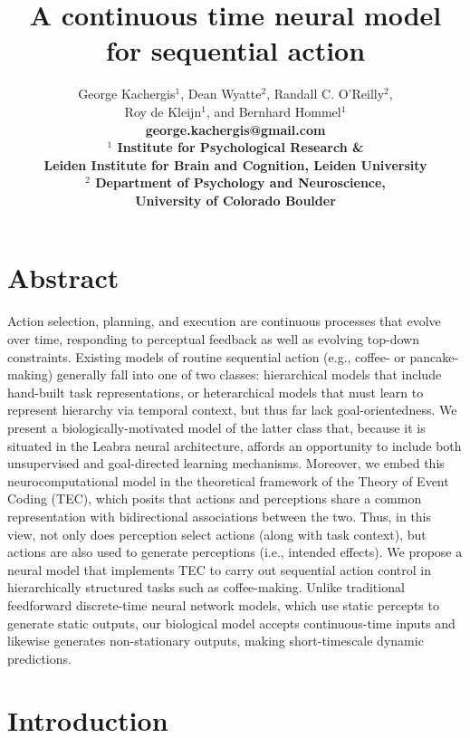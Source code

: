 \documentclass[10pt,letterpaper]{article}
\title{A continuous time neural model for sequential action}
\author{George Kachergis$^1$, Dean Wyatte$^2$, Randall C. O'Reilly$^2$, \\
	Roy de Kleijn$^1$, and Bernhard Hommel$^1$ \\
	\bf george.kachergis@gmail.com \\
	$^1$ Institute for Psychological Research \& \\
	Leiden Institute for Brain and Cognition, Leiden University \\
	$^2$ Department of Psychology and Neuroscience, \\
	University of Colorado Boulder }
\date{}
\numberwithin{equation}{section}
\begin{document}
\maketitle



\sloppy

\section*{Abstract}

Action selection, planning, and execution are continuous processes that evolve over time, responding to perceptual feedback as well as evolving top-down constraints. Existing models of routine sequential action (e.g., coffee- or pancake-making) generally fall into one of two classes: hierarchical models that include hand-built task representations, or heterarchical models that must learn to represent hierarchy via temporal context, but thus far lack goal-orientedness. We present a biologically-motivated model of the latter class that, because it is situated in the Leabra neural architecture, affords an opportunity to include both unsupervised and goal-directed learning mechanisms.  Moreover, we embed this neurocomputational model in the theoretical framework of the Theory of Event Coding (TEC), which posits that actions and perceptions share a common representation with bidirectional associations between the two. Thus, in this view, not only does perception select actions (along with task context), but actions are also used to generate perceptions (i.e., intended effects). We propose a neural model that implements TEC to carry out sequential action control in hierarchically structured tasks such as coffee-making. Unlike traditional feedforward discrete-time neural network models, which use static percepts to generate static outputs, our biological model accepts continuous-time inputs and likewise generates non-stationary outputs, making short-timescale dynamic predictions. 

\section*{Introduction}
\end{document}
